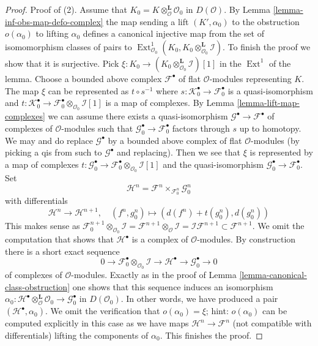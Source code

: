 \documentclass[10pt,a4paper]{amsart}
\theoremstyle{plain}
\theoremstyle{definition}
\theoremstyle{remark}
\numberwithin{equation}{subsection}
\def\Ext{\mathop{\mathrm{Ext}}\nolimits}
\begin{document}
\begin{proof}
\medskip\noindent
Proof of (2).
Assume that $K_0 = K \otimes_\mathcal{O}^\mathbf{L} \mathcal{O}_0$
in $D(\mathcal{O})$. By Lemma \ref{lemma-inf-obs-map-defo-complex}
the map sending a lift $(K', \alpha_0)$ to the obstruction $o(\alpha_0)$
to lifting $\alpha_0$ defines a canonical injective map
from the set of isomomorphism classes of pairs
to $\Ext^1_{\mathcal{O}_0}(K_0,
K_0 \otimes_{\mathcal{O}_0}^\mathbf{L} \mathcal{I})$.
To finish the proof we show that it is surjective.
Pick $\xi : K_0 \to (K_0 \otimes_{\mathcal{O}_0}^\mathbf{L} \mathcal{I})[1]$
in the $\Ext^1$ of the lemma.
Choose a bounded above complex $\mathcal{F}^\bullet$
of flat $\mathcal{O}$-modules representing $K$.
The map $\xi$ can be represented as $t \circ s^{-1}$
where $s : \mathcal{K}_0^\bullet \to \mathcal{F}_0^\bullet$
is a quasi-isomorphism and
$t : \mathcal{K}_0^\bullet \to
\mathcal{F}_0^\bullet \otimes_{\mathcal{O}_0} \mathcal{I}[1]$
is a map of complexes.
By Lemma \ref{lemma-lift-map-complexes}
we can assume there exists a quasi-isomorphism
$\mathcal{G}^\bullet \to \mathcal{F}^\bullet$
of complexes of $\mathcal{O}$-modules
such that $\mathcal{G}_0^\bullet \to \mathcal{F}_0^\bullet$
factors through $s$ up to homotopy.
We may and do replace $\mathcal{G}^\bullet$ by a bounded
above complex of flat $\mathcal{O}$-modules (by picking a qis
from such to $\mathcal{G}^\bullet$ and replacing).
Then we see that $\xi$ is represented by
a map of complexes
$t : \mathcal{G}_0^\bullet \to
\mathcal{F}_0^\bullet \otimes_{\mathcal{O}_0} \mathcal{I}[1]$
and the quasi-isomorphism $\mathcal{G}_0^\bullet \to \mathcal{F}_0^\bullet$.
Set
$$
\mathcal{H}^n = \mathcal{F}^n \times_{\mathcal{F}_0^n} \mathcal{G}_0^n
$$
with differentials
$$
\mathcal{H}^n \to \mathcal{H}^{n + 1},\quad
(f^n, g_0^n) \mapsto (d(f^n) + t(g_0^n), d(g_0^n))
$$
This makes sense as
$\mathcal{F}_0^{n + 1} \otimes_{\mathcal{O}_0} \mathcal{I} =
\mathcal{F}^{n + 1} \otimes_\mathcal{O} \mathcal{I} =
\mathcal{I}\mathcal{F}^{n + 1} \subset \mathcal{F}^{n + 1}$.
We omit the computation that shows that $\mathcal{H}^\bullet$
is a complex of $\mathcal{O}$-modules. By construction there is
a short exact sequence
$$
0 \to \mathcal{F}_0^\bullet \otimes_{\mathcal{O}_0} \mathcal{I} \to
\mathcal{H}^\bullet \to \mathcal{G}_0^\bullet \to 0
$$
of complexes of $\mathcal{O}$-modules.
Exactly as in the proof of Lemma \ref{lemma-canonical-class-obstruction}
one shows that this sequence induces an isomorphism
$\alpha_0 :
\mathcal{H}^\bullet \otimes_\mathcal{O}^\mathbf{L} \mathcal{O}_0 \to
\mathcal{G}_0^\bullet$ in $D(\mathcal{O}_0)$.
In other words, we have produced a pair $(\mathcal{H}^\bullet, \alpha_0)$.
We omit the verification that $o(\alpha_0) = \xi$; hint: $o(\alpha_0)$
can be computed explicitly in this case as we have maps
$\mathcal{H}^n \to \mathcal{F}^n$ (not compatible with differentials)
lifting the components of $\alpha_0$. This finishes the proof.
\end{proof}
\end{document}
